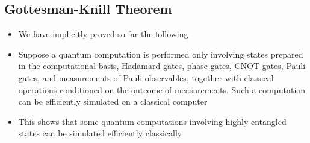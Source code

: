 \documentclass[12pt,a4paper]{article}
\numberwithin{equation}{section}
\begin{document}
	\subsection{Gottesman-Knill Theorem}
	\begin{itemize}
		\item We have implicitly proved so far the following
		\item Suppose a quantum computation is performed only involving states prepared in the computational basis, Hadamard gates, phase gates, CNOT gates, Pauli gates, and measurements of Pauli observables, together with classical operations conditioned on the outcome of measurements. Such a computation can be efficiently simulated on a classical computer
		\item This shows that some quantum computations involving highly entangled states can be simulated efficiently classically
	\end{itemize}
\end{document}
